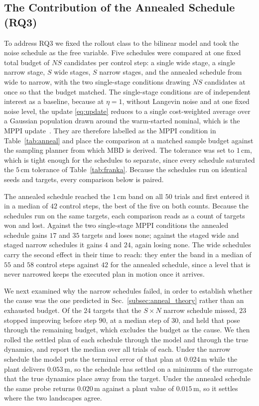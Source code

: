 \documentclass[letterpaper,10pt,conference]{ieeeconf}
\begin{document}
\subsection{The Contribution of the Annealed Schedule (RQ3)}\label{subsec:exp_anneal}

To address RQ3 we fixed the rollout class to the bilinear model and took the noise schedule as the free variable.
Five schedules were compared at one fixed total budget of $NS$ candidates per control step: a single wide stage, a single narrow stage, $S$ wide stages, $S$ narrow stages, and the annealed schedule from wide to narrow, with the two single-stage conditions drawing $NS$ candidates at once so that the budget matched.
The single-stage conditions are of independent interest as a baseline, because at $\eta = 1$, without Langevin noise and at one fixed noise level, the update \eqref{eq:update} reduces to a single cost-weighted average over a Gaussian population drawn around the warm-started nominal, which is the MPPI update~\cite{williams2017mppi}.
They are therefore labelled as the MPPI condition in Table~\ref{tab:anneal} and place the comparison at a matched sample budget against the sampling planner from which MBD is derived.
The tolerance was set to $1$\,cm, which is tight enough for the schedules to separate, since every schedule saturated the $5$\,cm tolerance of Table~\ref{tab:franka}.
Because the schedules run on identical seeds and targets, every comparison below is paired.

The annealed schedule reached the $1$\,cm band on all $50$ trials and first entered it in a median of $42$ control steps, the best of the five on both counts.
Because the schedules run on the same targets, each comparison reads as a count of targets won and lost.
Against the two single-stage MPPI conditions the annealed schedule gains $17$ and $35$ targets and loses none; against the staged wide and staged narrow schedules it gains $4$ and $24$, again losing none.
The wide schedules carry the second effect in their time to reach: they enter the band in a median of $55$ and $58$ control steps against $42$ for the annealed schedule, since a level that is never narrowed keeps the executed plan in motion once it arrives.

We next examined why the narrow schedules failed, in order to establish whether the cause was the one predicted in Sec.~\ref{subsec:anneal_theory} rather than an exhausted budget.
Of the $24$ targets that the $S \times N$ narrow schedule missed, $23$ stopped improving before step $90$, at a median step of $30$, and held that pose through the remaining budget, which excludes the budget as the cause.
We then rolled the settled plan of each schedule through the model and through the true dynamics, and report the median over all trials of each.
Under the narrow schedule the model puts the terminal error of that plan at $0.024$\,m while the plant delivers $0.053$\,m, so the schedule has settled on a minimum of the surrogate that the true dynamics place away from the target.
Under the annealed schedule the same probe returns $0.020$\,m against a plant value of $0.015$\,m, so it settles where the two landscapes agree.
\end{document}
